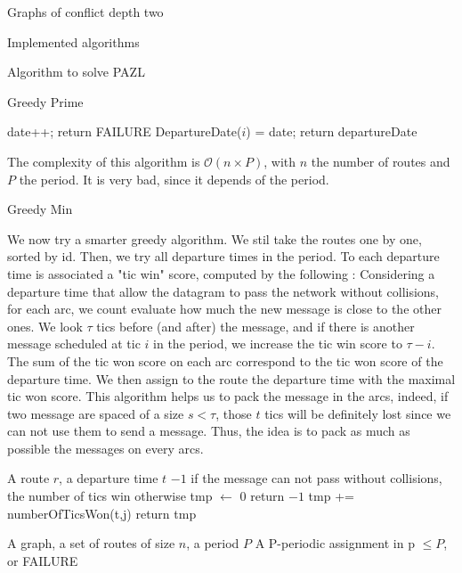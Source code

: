 \documentclass[10pt]{article}
\begin{document}
\begin{section}{Graphs of conflict depth two}
\begin{subsection}{Implemented algorithms}
\begin{subsubsection}{Algorithm to solve PAZL }
\begin{paragraph}{Greedy Prime}
\begin{algorithm}[H]
\begin{algorithmic}
 	\STATE date++;
	\STATE return FAILURE
	\ENDIF
 	\ENDWHILE
	\STATE DepartureDate($i$) = date;
 	\ENDFOR
	\STATE return departureDate
 	\end{algorithmic}
 	\end{algorithm}
 	The complexity of this algorithm is $\mathcal{O}(n\times P)$, with $n$ the number of routes and $P$ the period. It is very bad, since it depends of the period.
  \end{paragraph}
    \begin{paragraph}{Greedy Min}
  
  We now try a smarter greedy algorithm. We stil take the routes one by one, sorted by id. Then, we try all departure times in the period. To each departure time is associated a "tic win" score, computed by the following : Considering a departure time that allow the datagram to pass the network without collisions, for each arc, we count evaluate how much the new message is close to the other ones. We look $\tau$ tics before (and after) the message, and if there is another message scheduled at tic $i$ in the period, we increase the tic win score to $\tau -i$.
  The sum of the tic won score on each arc correspond to the tic won score of the departure time. We then assign to the route the departure time with the maximal tic won score.
  This algorithm helps us to pack the message in the arcs, indeed, if two message are spaced of a size $s < \tau$, those $t$ tics will be definitely lost since we can not use them to send a message. Thus, the idea is to pack as much as possible the messages on every arcs.
  
 
    	\begin{algorithm}[H]
 	\caption{ticsWin}
	\label{algo:ticswin}
 	\begin{algorithmic}
 	\REQUIRE A route $r$, a departure time $t$
	\ENSURE $-1$ if the message can not pass without collisions, the number of tics win otherwise
	\STATE tmp  $\leftarrow$ $0$
 	\STATE return $-1$
	\ELSE
	\STATE tmp += numberOfTicsWon(t,j)
 	\ENDIF
 	\ENDFOR
	\STATE return tmp
 	\end{algorithmic}
 	\end{algorithm}

	
   	\begin{algorithm}[H]
 	\caption{Greedy tics won}
 	\begin{algorithmic}
 	\REQUIRE A graph, a set of routes of size $n$, a period $P$
	\ENSURE A P-periodic assignment in p $\leq P$, or FAILURE


\end{algorithmic}
\end{algorithm}
\end{paragraph}
\end{subsubsection}
\end{subsection}
\end{section}
\end{document}
